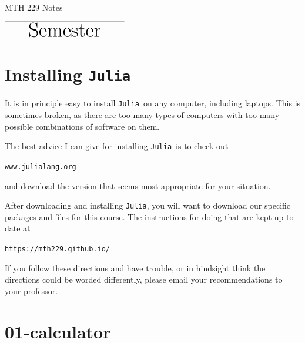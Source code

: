 \documentclass[12pt,answers]{book}
\newcommand{\julia}{{\tt Julia}}
\begin{document}
\begin{center}

~

\vspace{1cm}

{\Huge MTH 229 Notes}\vspace{2cm}

\vspace{1cm}$\overline{\text{\Huge \hspace{1cm}Semester\hspace{1cm}}}$\vspace{5cm}

\end{center}

 \hrulefill \vspace{1cm}

\hrulefill \vspace{1cm}

\hrulefill



\chapter*{Installing \julia}

It is in principle easy to install \julia\ on any computer, including laptops. This is sometimes broken, as there are too many types of computers with too many possible combinations of software on them.

The best advice I can give for installing \julia\ is to check out
\begin{center}
  \verb|www.julialang.org|
\end{center}
and download the version that seems most appropriate for your situation.

After downloading and installing \julia, you will want to download our specific packages and files for this course. The instructions for doing that are kept up-to-date at
\begin{center}
  \verb|https://mth229.github.io/|
\end{center}
If you follow these directions and have trouble, or in hindsight think the directions could be worded differently, please email your recommendations to your professor.

\chapter{01-calculator}
\end{document}
